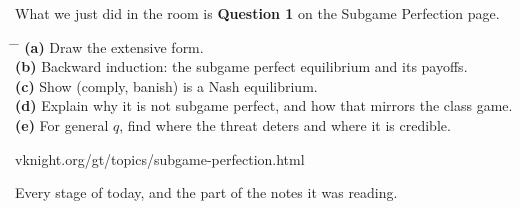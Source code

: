 \begin{center}
\end{center}

\newpage
{}

\vspace{0.5cm}

{\large What we just did in the room is \textbf{Question 1} on the Subgame
Perfection page.}

\vspace{0.9cm}

\hspace{0.6cm}
\begin{minipage}{0.92\linewidth}
{\large
\begin{tabbing}
\hspace{1.2cm} \= \hspace{17cm} \= \kill
\textbf{(a)} \> Draw the extensive form. \> [3]\\[0.55em]
\textbf{(b)} \> Backward induction: the subgame perfect equilibrium and its
  payoffs. \> [5]\\[0.55em]
\textbf{(c)} \> Show (comply, banish) is a Nash equilibrium. \> [5]\\[0.55em]
\textbf{(d)} \> Explain why it is not subgame perfect, and how that mirrors the
  class game. \> [6]\\[0.55em]
\textbf{(e)} \> For general \(q\), find where the threat deters and where it is
  credible. \> [4]
\end{tabbing}}
\end{minipage}

\vspace{1.2cm}

\begin{center}
{\large\color{inkgrey} vknight.org/gt/topics/subgame-perfection.html}
\end{center}

\newpage
\nonotes
{}

\vspace{0.3cm}

{\large Every stage of today, and the part of the notes it was reading.}

\vspace{0.25cm}

